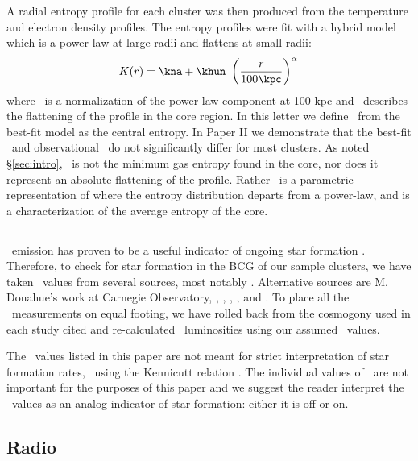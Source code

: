 \documentclass{emulateapj}
\begin{document}
A radial entropy profile for each cluster was then produced from the
temperature and electron density profiles. The entropy profiles were
fit with a hybrid model which is a power-law at large radii and
flattens at small radii:
\begin{equation}
  K(r) = \kna + \khun\ \left(\frac{r}{100 \kpc}\right)^{\alpha} \nonumber \\
\end{equation}
where \khun\ is a normalization of the power-law component at 100 kpc
and \kna\ describes the flattening of the profile in the core region.
In this letter we define \kna\ from the best-fit model as the central
entropy. In Paper II we demonstrate that the best-fit \kna\ and
observational \kna\ do not significantly differ for most clusters. As
noted \S\ref{sec:intro}, \kna\ is not the minimum gas entropy found in
the core, nor does it represent an absolute flattening of the profile.
Rather \kna\ is a parametric representation of where the entropy
distribution departs from a power-law, and is a characterization of
the average entropy of the core.

\subsection{\halpha}
\label{sec:ha}

\halpha\ emission has proven to be a useful indicator of ongoing star
formation \citep{johnstone87, mcnamara89, voit97}.  Therefore, to
check for star formation in the BCG of our sample clusters, we have
taken \halpha\ values from several sources, most notably
\cite{crawford99}.  Alternative sources are M.  Donahue's work at
Carnegie Observatory, \cite{ir_quillen}, \cite{heckman89},
\cite{lawrence96}, \cite{white97}, and \cite{2005MNRAS.363..216C}. To
place all the \halpha\ measurements on equal footing, we have rolled
back from the cosmogony used in each study cited and re-calculated
\halpha\ luminosities using our assumed \LCDM\ values.

The \lha\ values listed in this paper are not meant for strict
interpretation of star formation rates, \eg\ using the Kennicutt
relation \citep{kennicuttrelation}. The individual values of \lha\ are
not important for the purposes of this paper and we suggest the reader
interpret the \lha\ values as an analog indicator of star formation:
either it is off or on.

\subsection{Radio}
\label{sec:radio}
\end{document}
